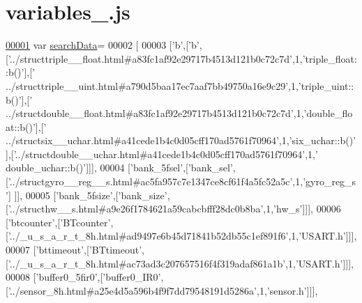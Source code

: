 \hypertarget{variables__2_8js_source}{}\section{variables\+\_.\+js}
\label{variables__2_8js_source}

\begin{DoxyCode}
\hypertarget{variables__2_8js_source.tex_l00001}{}\hyperlink{variables__2_8js_ad01a7523f103d6242ef9b0451861231e}{00001} var \hyperlink{variables__2_8js_ad01a7523f103d6242ef9b0451861231e}{searchData}=
00002 [
00003   [\textcolor{charliteral}{'b'},[\textcolor{charliteral}{'b'},[\textcolor{stringliteral}{'../structtriple\_\_float.html#a83fc1af92e29717b4513d121b0c72c7d'},1,\textcolor{stringliteral}{'triple\_float::b()'}],[\textcolor{stringliteral}{'
      ../structtriple\_\_uint.html#a790d5baa17ec7aaf7bb49750a16e9c29'},1,\textcolor{stringliteral}{'triple\_uint::b()'}],[\textcolor{stringliteral}{'
      ../structdouble\_\_float.html#a83fc1af92e29717b4513d121b0c72c7d'},1,\textcolor{stringliteral}{'double\_float::b()'}],[\textcolor{stringliteral}{'
      ../structsix\_\_uchar.html#a41cede1b4c0d05cff170ad5761f70964'},1,\textcolor{stringliteral}{'six\_uchar::b()'}],[\textcolor{stringliteral}{'../structdouble\_\_uchar.html#a41cede1b4c0d05cff170ad5761f70964'},1,\textcolor{stringliteral}{'
      double\_uchar::b()'}]]],
00004   [\textcolor{stringliteral}{'bank\_5fsel'},[\textcolor{stringliteral}{'bank\_sel'},[\textcolor{stringliteral}{'../structgyro\_\_reg\_\_s.html#ac5fa957c7e1347ce8cf61f4a5fc52a5c'},1,\textcolor{stringliteral}{'gyro\_reg\_s'}]
      ]],
00005   [\textcolor{stringliteral}{'bank\_5fsize'},[\textcolor{stringliteral}{'bank\_size'},[\textcolor{stringliteral}{'../structhw\_\_s.html#a9e26f1784621a59cabcbfff28dc0b8ba'},1,\textcolor{stringliteral}{'hw\_s'}]]],
00006   [\textcolor{stringliteral}{'btcounter'},[\textcolor{stringliteral}{'BTcounter'},[\textcolor{stringliteral}{'../\_u\_s\_a\_r\_t\_8h.html#ad9497e6b45d71841b52db55c1ef891f6'},1,\textcolor{stringliteral}{'USART.h'}]]],
00007   [\textcolor{stringliteral}{'bttimeout'},[\textcolor{stringliteral}{'BTtimeout'},[\textcolor{stringliteral}{'../\_u\_s\_a\_r\_t\_8h.html#ac73ad3c207657516f4f319adaf861a1b'},1,\textcolor{stringliteral}{'USART.h'}]]],
00008   [\textcolor{stringliteral}{'buffer0\_5fir0'},[\textcolor{stringliteral}{'buffer0\_IR0'},[\textcolor{stringliteral}{'../sensor\_8h.html#a25e4d5a596b4f9f7dd79548191d5286a'},1,\textcolor{stringliteral}{'sensor.h'}]]],

\end{DoxyCode}
